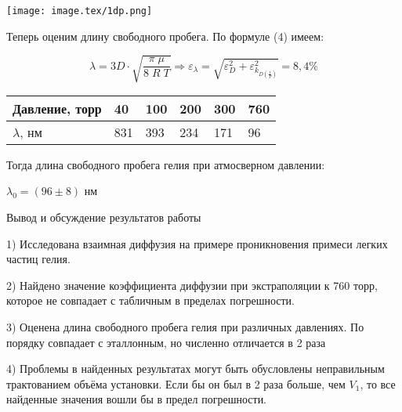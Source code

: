 \documentclass{article}
\begin{document}
\begin{center}
    \centering
    \texttt{[image: image.tex/1dp.png]}
\end{center}

Теперь оценим длину свободного пробега. По формуле (4) имеем:

\begin{equation}
    \lambda = 3D \cdot \sqrt{\frac{\pi\;\mu}{8\;R\;T}} \Rightarrow \varepsilon_{\lambda} = \sqrt{\varepsilon_{D}^{2} + \varepsilon_{k_{D\left(\frac{1}{P}\right)}}^{2}} = 8,4 \%
\end{equation}

\begin{center}
    \begin{tabular}{|m{8em}|m{2em}|m{2em}|m{2em}|m{2em}|m{2em}|}
        \hline
        Давление, торр  & 40  & 100 & 200 & 300 & 760\\
        \hline
        \(\lambda\), нм & 831 & 393 & 234 & 171 & 96 \\
        \hline
    \end{tabular}
\end{center}

Тогда длина свободного пробега гелия при атмосверном давлении:
\begin{center}
    \(\lambda_{0} = (96 \pm 8)\) нм
\end{center}

\begin{center}
    \raggedleft
    {
        \LARGE {Вывод и обсуждение результатов работы}
    }
    \hline
    \hline
\end{center}

1) Исследована взаимная диффузия на примере проникновения примеси легких частиц гелия.

2) Найдено значение коэффициента диффузии при экстраполяции к 760 торр, которое не совпадает с табличным в пределах погрешности.

3) Оценена длина свободного пробега гелия при различных давлениях. По порядку совпадает с эталлонным, но численно отличается в 2 раза

4) Проблемы в найденных результатах могут быть обусловлены неправильным трактованием объёма установки. Если бы он был в 2 раза больше, чем \(V_{1}\), то все найденные значения вошли бы в предел погрешности.
\end{document}
